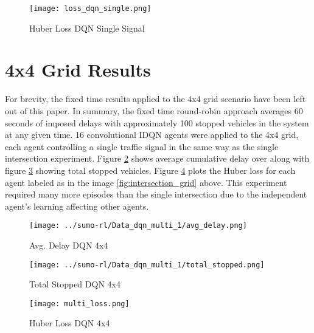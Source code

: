 \documentclass[letterpaper]{article} %
\begin{document}
\begin{figure}[htbp]
  \centering
  \texttt{[image: loss\_dqn\_single.png]}
  \caption{Huber Loss DQN Single Signal}
  \label{fig:loss_dqn_single}
\end{figure}

\section{4x4 Grid Results}
For brevity, the fixed time results applied to the 4x4 grid scenario have been left out of this paper.
In summary, the fixed time round-robin approach averages 60 seconds of imposed delays with approximately 100 stopped vehicles in the system at any given time.
16 convolutional IDQN agents were applied to the 4x4 grid, each agent controlling a single traffic signal in the same way as the single intersection experiment.
Figure \ref{fig:delays_dqn_multi} shows average cumulative delay over along with figure \ref{fig:total_stopped_dqn_multi} showing total stopped vehicles.
Figure \ref{fig:loss_dqn_multi} plots the Huber loss for each agent labeled as in the image \ref{fig:intersection_grid} above.
This experiment required many more episodes than the single intersection due to the independent agent's learning affecting other agents.

\begin{figure}[htbp]
  \centering
  \texttt{[image: ../sumo-rl/Data\_dqn\_multi\_1/avg\_delay.png]}
  \caption{Avg. Delay DQN 4x4}
  \label{fig:delays_dqn_multi}
\end{figure}

\begin{figure}[htbp]
  \centering
  \texttt{[image: ../sumo-rl/Data\_dqn\_multi\_1/total\_stopped.png]}
  \caption{Total Stopped DQN 4x4}
  \label{fig:total_stopped_dqn_multi}
\end{figure}

\begin{figure}[htbp]
  \centering
  \texttt{[image: multi\_loss.png]}
  \caption{Huber Loss DQN 4x4}
  \label{fig:loss_dqn_multi}
\end{figure}
\end{document}
